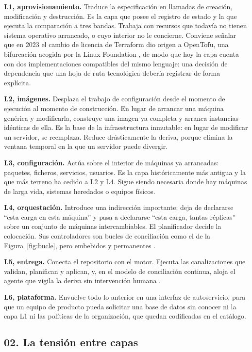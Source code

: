 \documentclass[11pt,letterpaper]{article}
\newcommand{\subsec}[1]{%
  \subsection*{#1}%
  \phantomsection\addcontentsline{toc}{subsection}{#1}}
\begin{document}
\textbf{L1, aprovisionamiento.} Traduce la especificación en llamadas de
creación, modificación y destrucción. Es la capa que posee el registro de
estado y la que ejecuta la comparación a tres bandas. Trabaja con recursos que
todavía no tienen sistema operativo arrancado, o cuyo interior no le
concierne. Conviene señalar que en 2023 el cambio de licencia de Terraform dio
origen a OpenTofu, una bifurcación acogida por la Linux Foundation
\parencite{opentofu}, de modo que hoy la capa cuenta con dos implementaciones
compatibles del mismo lenguaje: una decisión de dependencia que una hoja de
ruta tecnológica debería registrar de forma explícita.

\textbf{L2, imágenes.} Desplaza el trabajo de configuración desde el momento
de ejecución al momento de construcción. En lugar de arrancar una máquina
genérica y modificarla, construye una imagen ya completa y arranca instancias
idénticas de ella. Es la base de la infraestructura inmutable: en lugar de
modificar un servidor, se reemplaza. Reduce drásticamente la deriva, porque
elimina la ventana temporal en la que un servidor puede divergir.

\textbf{L3, configuración.} Actúa sobre el interior de máquinas ya arrancadas:
paquetes, ficheros, servicios, usuarios. Es la capa históricamente más antigua
y la que más terreno ha cedido a L2 y L4. Sigue siendo necesaria donde hay
máquinas de larga vida, sistemas heredados o equipos físicos.

\textbf{L4, orquestación.} Introduce una indirección importante: deja de
declararse \enquote{esta carga en esta máquina} y pasa a declararse
\enquote{esta carga, tantas réplicas} sobre un conjunto de máquinas
intercambiables. El planificador decide la colocación. Sus controladores son
bucles de conciliación como el de la Figura~\ref{fig:bucle}, pero embebidos y
permanentes \parencite{k8scontrollers}.

\textbf{L5, entrega.} Conecta el repositorio con el motor. Ejecuta las
canalizaciones que validan, planifican y aplican, y, en el modelo de
conciliación continua, aloja el agente que vigila la deriva sin intervención
humana \parencite{opengitops,humble2010}.

\textbf{L6, plataforma.} Envuelve todo lo anterior en una interfaz de
autoservicio, para que un equipo de producto pueda solicitar una base de datos
sin conocer ni la capa L1 ni las políticas de la organización, que quedan
codificadas en el catálogo.

\subsec{02. La tensión entre capas}
\end{document}
